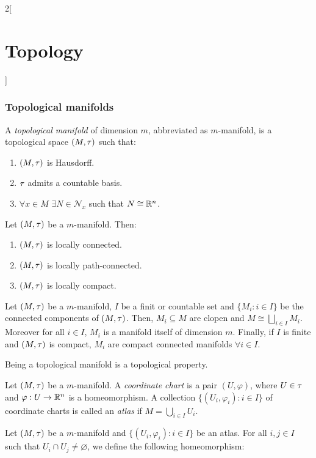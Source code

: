 \documentclass[../../../main.tex]{subfiles}
\begin{document}
\begin{multicols}{2}[\section{Topology}]
  \subsubsection{Topological manifolds}
  \begin{definition}
    A \emph{topological manifold} of dimension $m$, abbreviated as $m$-manifold, is a topological space $(M,\tau)$ such that:
    \begin{enumerate}
      \item $(M,\tau)$ is Hausdorff.
      \item $\tau$ admits a countable basis.
      \item $\forall x\in M$ $\exists N\in\mathcal{N}_x$ such that $N\cong\mathbb{R}^n$.
    \end{enumerate}
  \end{definition}
  \begin{prop}
    Let $(M,\tau)$ be a $m$-manifold. Then:
    \begin{enumerate}
      \item $(M,\tau)$ is locally connected.
      \item $(M,\tau)$ is locally path-connected.
      \item $(M,\tau)$ is locally compact.
    \end{enumerate}
  \end{prop}
  \begin{corollary}
    Let $(M,\tau)$ be a $m$-manifold, $I$ be a finit or countable set and $\{M_i:i\in I\}$ be the connected components of $(M,\tau)$. Then, $M_i\subseteq M$ are clopen and $M\cong\bigsqcup_{i\in I}M_i$. Moreover for all $i\in I$, $M_i$ is a manifold itself of dimension $m$. Finally, if $I$ is finite and $(M,\tau)$ is compact, $M_i$ are compact connected manifolds $\forall i\in I$.
  \end{corollary}
  \begin{prop}
    Being a topological manifold is a topological property.
  \end{prop}
  \begin{definition}
    Let $(M,\tau)$ be a $m$-manifold. A \emph{coordinate chart} is a pair $(U,\varphi)$, where $U\in\tau$ and $\varphi:U\rightarrow\mathbb{R}^n$ is a homeomorphism. A collection $\{(U_i,\varphi_i):i\in I\}$ of coordinate charts is called an \emph{atlas} if $M=\bigcup_{i\in I}U_i$.
  \end{definition}
  \begin{definition}
    Let $(M,\tau)$ be a $m$-manifold and $\{(U_i,\varphi_i):i\in I\}$ be an atlas. For all $i,j\in I$ such that $U_i\cap U_j\ne \varnothing$, we define the following homeomorphism: $$
$$
\end{definition}
\end{multicols}
\end{document}
